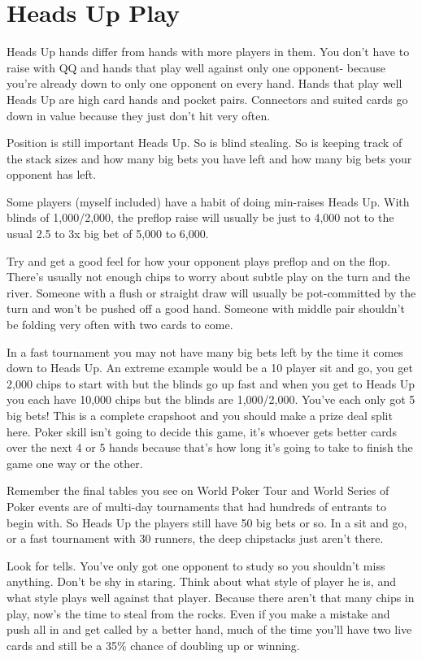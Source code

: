 \section{Heads Up Play}

Heads Up hands differ from hands with more players in them.
You don't have to raise with QQ and hands that play well
against only one opponent- because you're already down
to only one opponent on every hand. Hands that play
well Heads Up are high card hands and pocket pairs.
Connectors and suited cards go down in value because
they just don't hit very often.

Position is still important Heads Up. So is blind stealing.
So is keeping track of the stack sizes and how many big bets
you have left and how many big bets your opponent has left.

Some players (myself included) have a habit of doing min-raises
Heads Up. With blinds of 1,000/2,000, the preflop raise will usually
be just to 4,000 not to the usual 2.5 to 3x big bet of 5,000 to 6,000.

Try and get a good feel for how your opponent plays
preflop and on the flop. There's usually not enough
chips to worry about subtle play on the turn and the river.
Someone with a flush or straight draw will usually be
pot-committed by the turn and won't be pushed off a
good hand. Someone with middle pair shouldn't be folding
very often with two cards to come.

In a fast tournament you may not have many big bets left by
the time it comes down to Heads Up. An extreme example would
be a 10 player sit and go, you get 2,000 chips to start with
but the blinds go up fast and when you get to Heads Up
you each have 10,000 chips but the blinds are 1,000/2,000.
You've each only got 5 big bets! This is a complete
crapshoot and you should make a prize deal split here. Poker skill
isn't going to decide this game, it's whoever gets better
cards over the next 4 or 5 hands because that's how long
it's going to take to finish the game one way or the other.


Remember the final tables you see on World Poker Tour and
World Series of Poker events are of multi-day tournaments that had
hundreds of entrants to begin with. So Heads Up the players
still have 50 big bets or so. In a sit and go, or
a fast tournament with 30 runners, the deep chipstacks
just aren't there.

Look for tells. You've only got one opponent to study so
you shouldn't miss anything. Don't be shy in staring.
Think about what style of player he is, and what style
plays well against that player. Because there aren't
that many chips in play, now's the time to steal from
the rocks. Even if you make a mistake and push all in
and get called by a better hand, much of the time you'll
have two live cards and still be a 35\% chance of doubling
up or winning.

